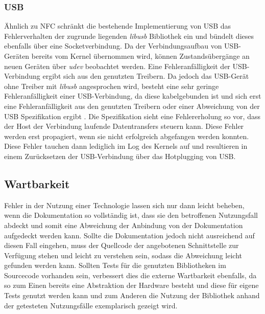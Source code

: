           \subsubsection{USB} Ähnlich zu NFC schränkt die bestehende Implementierung von USB das Fehlerverhalten der zugrunde liegenden {\it libusb} Bibliothek ein und bündelt dieses ebenfalls über eine Socketverbindung. Da der Verbindungsaufbau von USB-Geräten bereits vom Kernel übernommen wird, können Zustandsübergänge an neuen Geräten über {\it udev} beobachtet werden. Eine Fehleranfälligkeit der USB-Verbindung ergibt sich aus den genutzten Treibern. Da jedoch das USB-Gerät ohne Treiber mit {\it libusb} angesprochen wird, besteht eine sehr geringe Fehleranfälligkeit einer USB-Verbindung, da diese kabelgebunden ist und sich erst eine Fehleranfälligkeit aus den genutzten Treibern oder einer Abweichung von der USB Spezifikation ergibt \cite{usbSpec}. Die Spezifikation sieht eine Fehlererholung so vor, dass der Host der Verbindung laufende Datentransfers steuern kann. Diese Fehler werden erst propagiert, wenn sie nicht erfolgreich abgefangen werden konnten. Diese Fehler tauchen dann lediglich im Log des Kernels auf und resultieren in einem Zurücksetzen der USB-Verbindung über das Hotplugging von USB.
		
		\subsection{Wartbarkeit}
		Fehler in der Nutzung einer Technologie lassen sich nur dann leicht beheben, wenn die Dokumentation so vollständig ist, dass sie den betroffenen Nutzungsfall abdeckt und somit eine Abweichung der Anbindung von der Dokumentation aufgedeckt werden kann. Sollte die Dokumentation jedoch nicht ausreichend auf diesen Fall eingehen, muss der Quellcode der angebotenen Schnittstelle zur Verfügung stehen und leicht zu verstehen sein, sodass die Abweichung leicht gefunden werden kann. Sollten Tests für die genutzten Bibliotheken im Sourcecode vorhanden sein, verbessert dies die externe Wartbarkeit ebenfalls, da so zum Einen bereits eine Abstraktion der Hardware besteht und diese für eigene Tests genutzt werden kann und zum Anderen die Nutzung der Bibliothek anhand der getesteten Nutzungsfälle exemplarisch gezeigt wird.
		
